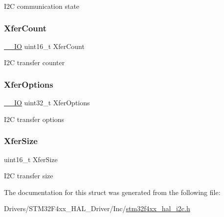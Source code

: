 I2C communication state \mbox{\label{struct_i2_c___handle_type_def_a49bf3cd0e9bcb9f41f161663f513f405}} 
\subsubsection{\texorpdfstring{Xfer\+Count}{XferCount}}
{\footnotesize\ttfamily \mbox{\hyperlink{core__sc300_8h_aec43007d9998a0a0e01faede4133d6be}{\+\_\+\+\_\+\+IO}} uint16\+\_\+t Xfer\+Count}

I2C transfer counter \mbox{\label{struct_i2_c___handle_type_def_a275aa3c8180a03dbe4bf55fafba3e892}} 
\subsubsection{\texorpdfstring{Xfer\+Options}{XferOptions}}
{\footnotesize\ttfamily \mbox{\hyperlink{core__sc300_8h_aec43007d9998a0a0e01faede4133d6be}{\+\_\+\+\_\+\+IO}} uint32\+\_\+t Xfer\+Options}

I2C transfer options \mbox{\label{struct_i2_c___handle_type_def_a51999331ab800faccdb97383b39819dd}} 
\subsubsection{\texorpdfstring{Xfer\+Size}{XferSize}}
{\footnotesize\ttfamily uint16\+\_\+t Xfer\+Size}

I2C transfer size 

The documentation for this struct was generated from the following file\+:\begin{DoxyCompactItemize}
\item 
Drivers/\+S\+T\+M32\+F4xx\+\_\+\+H\+A\+L\+\_\+\+Driver/\+Inc/\mbox{\hyperlink{stm32f4xx__hal__i2c_8h}{stm32f4xx\+\_\+hal\+\_\+i2c.\+h}}\end{DoxyCompactItemize}
